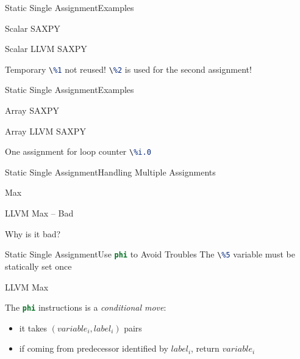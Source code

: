\documentclass[10pt,mathserif]{beamer}
\newcommand{\cinput}[1]{}
\newcommand{\llvminput}[1]{}
\newcommand{\llvminline}[1]{\lstinline[language=LLVM]!#1!}
\begin{document}
\begin{frame}{Static Single Assignment}{Examples}
\begin{block}{Scalar SAXPY}
\centering
\cinput{snippet/02/scalar-saxpy.c}
\end{block}

\begin{block}{Scalar LLVM SAXPY}
\centering
\llvminput{snippet/02/scalar-saxpy.ll}
\end{block}

Temporary \llvminline{\%1} not reused! \llvminline{\%2} is used for the second
assignment!
\end{frame}

\begin{frame}{Static Single Assignment}{Examples}
\begin{block}{Array SAXPY}
\centering
\cinput{snippet/02/array-saxpy.c}
\end{block}

\begin{block}{Array LLVM SAXPY}
\centering
\llvminput{snippet/02/array-saxpy.ll}
\end{block}

One assignment for loop counter \llvminline{\%i.0}
\end{frame}

\begin{frame}{Static Single Assignment}{Handling Multiple Assignments}
\begin{block}{Max}
\centering
\cinput{snippet/02/max.c}
\end{block}

\begin{block}{LLVM Max -- Bad}
\centering
\llvminput{snippet/02/bad-max.ll}
\end{block}

Why is it bad?
\end{frame}

\begin{frame}{Static Single Assignment}{Use \llvminline{phi} to Avoid Troubles}
The \llvminline{\%5} variable must be statically set once

\begin{block}{LLVM Max}
\centering
\llvminput{snippet/02/good-max.ll}
\end{block}

The \llvminline{phi} instructions is a \emph{conditional move}:

\begin{itemize}
\item it takes $(variable_i, label_i)$ pairs
\item if coming from predecessor identified by $label_i$, return $variable_i$
\end{itemize}
\end{frame}
\end{document}
